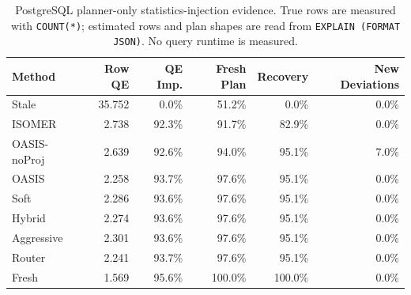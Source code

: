 \begin{table}[t]
  \centering
  \small
  \caption{PostgreSQL planner-only statistics-injection evidence. True rows are measured with \texttt{COUNT(*)}; estimated rows and plan shapes are read from \texttt{EXPLAIN (FORMAT JSON)}. No query runtime is measured.}
  \label{tab:postgres_planner_stats_injection}
  \setlength{\tabcolsep}{4pt}
  \begin{tabular}{lrrrrr}
    \toprule
    Method & Row QE & QE Imp. & Fresh Plan & Recovery & New Deviations \\
    \midrule
    Stale & 35.752 & 0.0\% & 51.2\% & 0.0\% & 0.0\% \\
    ISOMER & 2.738 & 92.3\% & 91.7\% & 82.9\% & 0.0\% \\
    OASIS-noProj & 2.639 & 92.6\% & 94.0\% & 95.1\% & 7.0\% \\
    OASIS & 2.258 & 93.7\% & 97.6\% & 95.1\% & 0.0\% \\
    Soft & 2.286 & 93.6\% & 97.6\% & 95.1\% & 0.0\% \\
    Hybrid & 2.274 & 93.6\% & 97.6\% & 95.1\% & 0.0\% \\
    Aggressive & 2.301 & 93.6\% & 97.6\% & 95.1\% & 0.0\% \\
    Router & 2.241 & 93.7\% & 97.6\% & 95.1\% & 0.0\% \\
    Fresh & 1.569 & 95.6\% & 100.0\% & 100.0\% & 0.0\% \\
    \bottomrule
  \end{tabular}
\end{table}
